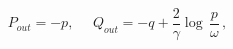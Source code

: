\begin{equation}\label{out-varibales}
P_{out}=-p, ~~~~~~Q_{out}=-q+\frac{2}{\gamma}\log\,\frac{p}{\omega}\,,
\end{equation}

